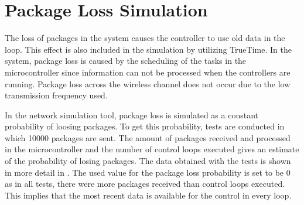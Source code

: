 \section{Package Loss Simulation}
The loss of packages in the system causes the controller to use old data in the loop. This effect is also included in the simulation by utilizing TrueTime. In the system, package loss is caused by the scheduling of the tasks in the microcontroller since information can not be processed when the controllers are running. Package loss across the wireless channel does not occur due to the low transmission frequency used. 

In the network simulation tool, package loss is simulated as a constant probability of loosing packages. To get this probability, tests are conducted in which 10000 packages are sent. The amount of packages received and processed in the microcontroller and the number of control loops executed gives an estimate of the probability of losing packages. The data obtained with the tests is shown in more detail in . The used value for the package loss probability is set to be 0 as in all tests, there were more packages received than control loops executed. This implies that the most recent data is available for the control in every loop. 
